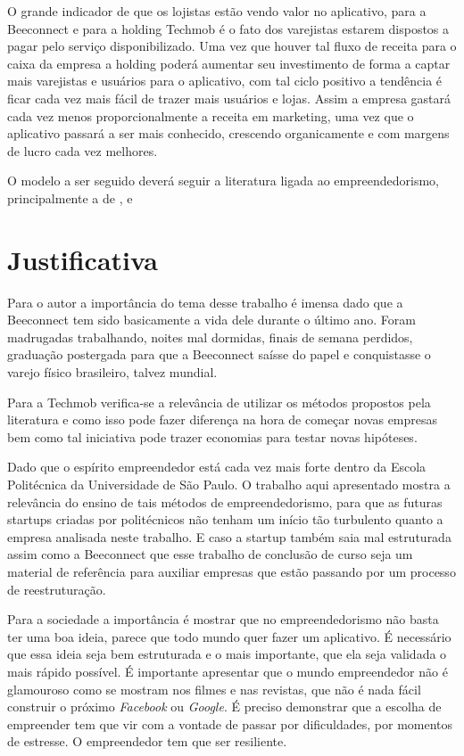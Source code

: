 O grande indicador de que os lojistas estão vendo valor no aplicativo, para a Beeconnect e para a holding Techmob é o fato dos varejistas estarem dispostos a pagar pelo serviço disponibilizado. Uma vez que houver tal fluxo de receita para o caixa da empresa a holding poderá aumentar seu investimento de forma a captar mais varejistas e usuários para o aplicativo, com tal ciclo positivo a tendência é ficar cada vez mais fácil de trazer mais usuários e lojas. Assim a empresa gastará cada vez menos proporcionalmente a receita em marketing, uma vez que o aplicativo passará a ser mais conhecido, crescendo organicamente e com margens de lucro cada vez melhores. 

O modelo a ser seguido deverá seguir a literatura ligada ao empreendedorismo, principalmente a de ,  e 

\section{Justificativa}
\label{cha:justificativa}
Para o autor a importância do tema desse trabalho é imensa dado que a Beeconnect tem sido basicamente a vida dele durante o último ano. Foram madrugadas trabalhando, noites mal dormidas, finais de semana perdidos, graduação postergada para que a Beeconnect saísse do papel e conquistasse o varejo físico brasileiro, talvez mundial.

Para a Techmob verifica-se a relevância de utilizar os métodos propostos pela literatura e como isso pode fazer diferença na hora de começar novas empresas bem como tal iniciativa pode trazer economias para testar novas hipóteses.

Dado que o espírito empreendedor está cada vez mais forte dentro da Escola Politécnica da Universidade de São Paulo. O trabalho aqui apresentado mostra a relevância do ensino de tais métodos de empreendedorismo, para que as futuras startups criadas por politécnicos não tenham um início tão turbulento quanto a empresa analisada neste trabalho. E caso a startup também saia mal estruturada assim como a Beeconnect que esse trabalho de conclusão de curso seja um material de referência para auxiliar empresas que estão passando por um processo de reestruturação.

Para a sociedade a importância é mostrar que no empreendedorismo não basta ter uma boa ideia, parece que todo mundo quer fazer um aplicativo. É necessário que essa ideia seja bem estruturada e o mais importante, que ela seja validada o mais rápido possível. É importante apresentar que o mundo empreendedor não é glamouroso como se mostram nos filmes e nas revistas, que não é nada fácil construir o próximo \textit{Facebook} ou \textit{Google}. É preciso demonstrar que a escolha de empreender tem que vir com a vontade de passar por dificuldades, por momentos de estresse. O empreendedor tem que ser resiliente. 

